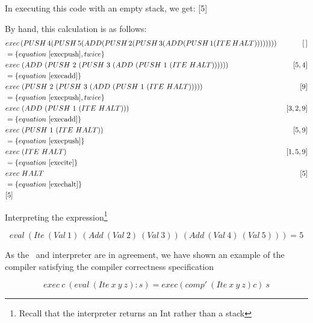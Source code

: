 \documentclass {article}
\begin{document}
In executing this code with an empty stack, we get: [5]

By hand, this calculation is as follows:
\begin{align*}
	&exec \, (PUSH \, 4 (PUSH \, 5 (ADD (PUSH \, 2 (PUSH \, 3(ADD(PUSH \, 1(ITE \, HALT)))))))) \ &[\, ] \\
	&= \{equation \ \ref{execpush}, twice\} \\ 
	&exec \ (ADD \ (PUSH \ 2 \ (PUSH \ 3 \ (ADD \ (PUSH \ 1 \ (ITE \ HALT)))))) \ &[5,4] \\
	&= \{equation \ \ref{execadd}\} \\
	&exec \ (PUSH \ 2 \ (PUSH \ 3 \ (ADD \ (PUSH \ 1 \ (ITE \ HALT))))) \ &[9] \\
	&= \{equation \ \ref{execpush}, twice\} \\ 
	&exec \ (ADD \ (PUSH \ 1 \ (ITE \ HALT))) \ &[3, 2, 9] \\
	&= \{equation \ \ref{execadd}\} \\
	&exec \ (PUSH \ 1 \ (ITE \ HALT)) \ &[5, 9] \\
	&= \{equation \ \ref{execpush}\} \\
	&exec \ (ITE \ HALT) \ &[1, 5, 9] \\
	&= \{equation \ \ref{execite}\} \\
	&exec \ HALT \ &[5] \\
	&= \{equation \ \ref{exechalt}\} \\
	&[5]
\end{align*}

Interpreting the expression\footnote{
Recall that the interpreter returns an Int rather than a stack}

	\[ eval\ (Ite\ (Val\ 1)\ (Add\ (Val\ 2)\ (Val\ 3))\ (Add\ (Val\ 4)\ (Val\ 5))) = 5\]

As the \vm\ and interpreter are in agreement,
we have shown an example of the compiler 
satisfying the compiler correctness specification

\[ exec \ c \ (eval \ (Ite \ x \ y \ z):s) 
	= exec (comp' \ (Ite \ x \ y \ z) c)  \ s  \]
\end{document}
